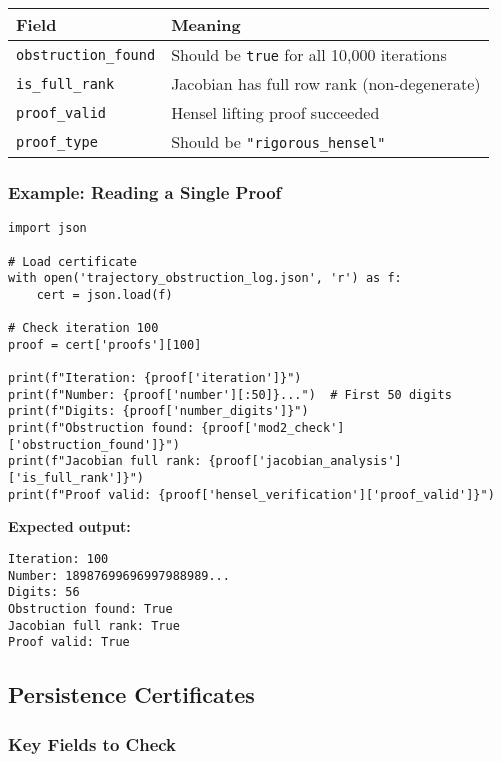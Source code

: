 \documentclass[11pt,a4paper]{article}
\theoremstyle{definition}
\newcommand{\code}[1]{\texttt{#1}}
\begin{document}
\begin{table}[H]
\centering
\begin{tabular}{@{}lp{8cm}@{}}
\toprule
\textbf{Field} & \textbf{Meaning} \\
\midrule
\code{obstruction\_found} & Should be \code{true} for all 10,000 iterations \\
\code{is\_full\_rank} & Jacobian has full row rank (non-degenerate) \\
\code{proof\_valid} & Hensel lifting proof succeeded \\
\code{proof\_type} & Should be \code{"rigorous\_hensel"} \\
\bottomrule
\end{tabular}
\end{table}

\subsubsection{Example: Reading a Single Proof}

\begin{lstlisting}[style=pythonstyle, caption={Interpreting a Single Proof}]
import json

# Load certificate
with open('trajectory_obstruction_log.json', 'r') as f:
    cert = json.load(f)

# Check iteration 100
proof = cert['proofs'][100]

print(f"Iteration: {proof['iteration']}")
print(f"Number: {proof['number'][:50]}...")  # First 50 digits
print(f"Digits: {proof['number_digits']}")
print(f"Obstruction found: {proof['mod2_check']['obstruction_found']}")
print(f"Jacobian full rank: {proof['jacobian_analysis']['is_full_rank']}")
print(f"Proof valid: {proof['hensel_verification']['proof_valid']}")
\end{lstlisting}

\textbf{Expected output:}
\begin{lstlisting}[style=bashstyle]
Iteration: 100
Number: 18987699696997988989...
Digits: 56
Obstruction found: True
Jacobian full rank: True
Proof valid: True
\end{lstlisting}

\subsection{Persistence Certificates}

\subsubsection{Key Fields to Check}
\end{document}
